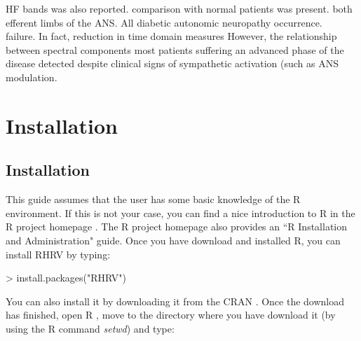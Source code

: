 \documentclass[12pt,lot, lof]{puthesis}
\begin{document}
\gls{HF} bands was also reported.
comparison with normal patients was present.
both efferent limbs of the \gls{ANS}. All
diabetic autonomic neuropathy occurrence.\\
%
%
%
failure. In fact, reduction in time domain measures
However, the relationship between spectral components
most patients suffering an advanced phase of the disease
detected despite clinical signs of sympathetic activation (such as 
\gls{ANS} modulation.\\






\chapter{Installation\label{ch:installation}}
\section{Installation} This guide assumes that the user has some basic 
knowledge of the R environment. If this is not your case, you can find a nice 
introduction to R in the R project homepage \cite{Rproject}. The R project 
homepage also provides an ``R Installation and Administration" guide. Once you 
have download and installed R, you can install RHRV by typing:
\begin{Schunk}
\begin{Sinput}
> install.packages("RHRV")
\end{Sinput}
\end{Schunk}
You can also install it by downloading it from the CRAN \cite{cran}. Once the 
download has finished, open R , move to the directory where you have download 
it (by using the R command \textit{setwd}) and type:
\end{document}
